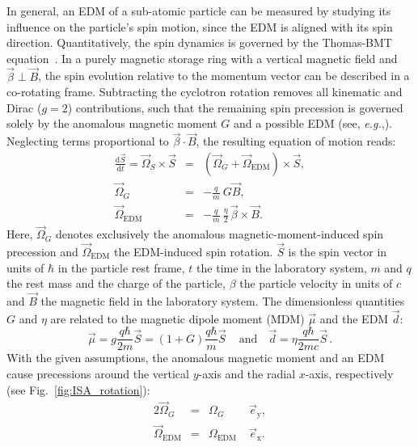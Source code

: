 \documentclass[
    10pt,
    twocolumn,
    secnumarabic,
    amssymb,
    nobibnotes,
    aps,
    prl,

    longbibliography,
    superscriptaddress
    ]{revtex4-2}
\begin{document}
In general, an EDM of a sub-atomic particle can be measured by studying its influence on the particle's spin motion, since the EDM is aligned with its spin direction.
Quantitatively, the spin dynamics is governed by the Thomas-BMT equation~\cite{Bargmann:1959gz,Nelson:1959zz,Fukuyama:2013ioa}.
In a purely magnetic storage ring with a vertical magnetic field and $\vec\beta \perp \vec B$, the spin evolution relative to the momentum vector can be described in a co-rotating frame.
Subtracting the cyclotron rotation removes all kinematic and Dirac ($g=2$) contributions, such that the remaining spin precession is governed solely by the anomalous magnetic moment $G$ and a possible EDM (see, \emph{e.g.},\cite{chupp:2017rkp}).
Neglecting terms proportional to $\vec\beta\cdot\vec B$, the resulting equation of motion reads:
\begin{eqnarray}
\frac{\text{d} \vec{S}}{\text{d}t} = \vec\Omega_S \times \vec{S} &=& (\vec{\Omega}_G + \vec{\Omega}_{\mathrm{EDM}}) \times \vec{S},  \label{eq:tbmt}\\
 \vec{\Omega}_G &=&  -\frac{q}{m} ~ G \vec B \label{eq:tbmt_mdm},\\
 \vec{\Omega}_{\mathrm{EDM}} &=& -\frac{q}{m} ~\frac{\eta}{2} \,  \vec{\beta} \times \vec{B}. \label{eq:omedm}
\end{eqnarray}
Here, $\vec\Omega_G$ denotes exclusively the anomalous magnetic-moment-induced spin precession
and $\vec{\Omega}_{\mathrm{EDM}}$ the EDM-induced spin rotation.
$\vec{S}$ is the spin vector in units of $\hbar$ in the particle rest frame, $t$ the time in the laboratory system, $m$ and $q$ the rest mass and the charge of the particle, $\beta$ the particle velocity in units of $c$ and $\vec{B}$ the magnetic field in the laboratory system.
The dimensionless quantities $G$ and $\eta$ are related to the magnetic dipole moment (MDM) $\vec \mu$ and the EDM $\vec d$:
\begin{equation}
\vec{\mu} =
g \frac{q \hbar}{2 m} \vec{S} =
(1+G) \frac{q \hbar}{m} \vec{S}\, \quad \mbox{and} \quad \vec{d} = \eta \frac{q \hbar}{2 m c} \vec{S} \, .
\label{eq:mdm_and_edm}
\end{equation}
With the given assumptions, the anomalous magnetic moment and an EDM cause precessions around the vertical $y$-axis and the radial $x$-axis, respectively (see Fig.~\ref{fig:ISA_rotation}):
\begin{alignat}{2}
\vec{\Omega}_G &{}={}& \Omega_G&\;\vec{e}_\mathrm{y},  \\
\vec{\Omega}_\mathrm{EDM} &{}={}& \Omega_\mathrm{EDM}&\;\vec{e}_\mathrm{x}.
\end{alignat}
\end{document}

